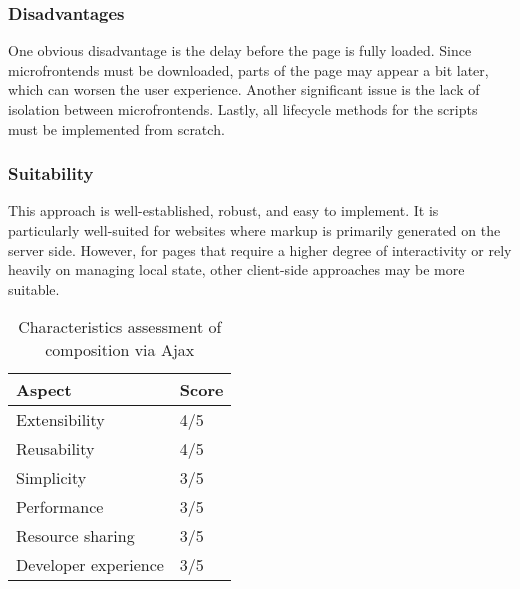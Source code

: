 \subsubsection{Disadvantages}
One obvious disadvantage is the delay before the page is fully loaded. Since microfrontends must be downloaded, parts of the page may appear a bit later, which can worsen the user experience. Another significant issue is the lack of isolation between microfrontends. Lastly, all lifecycle methods for the scripts must be implemented from scratch. \cite{MicrofrontendsInAction}

\subsubsection{Suitability}
This approach is well-established, robust, and easy to implement. It is particularly well-suited for websites where markup is primarily generated on the server side. However, for pages that require a higher degree of interactivity or rely heavily on managing local state, other client-side approaches may be more suitable. \cite{MicrofrontendsInAction}

\begin{table}[h]
  \centering
  \begin{tabular}{|l|l|}
     \hline
        \textbf{Aspect} & \textbf{Score} \\
     \hline
        Extensibility & 4/5 \\
     \hline
        Reusability & 4/5 \\
     \hline
        Simplicity & 3/5 \\
     \hline
        Performance & 3/5 \\
     \hline
        Resource sharing & 3/5 \\
     \hline
        Developer experience & 3/5 \\
     \hline
  \end{tabular}
  \caption{Characteristics assessment of composition via Ajax}
  \label{table:links-composition}
\end{table}